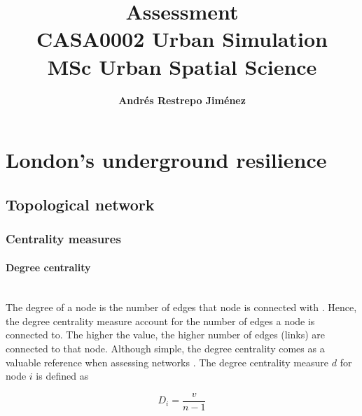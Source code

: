 \documentclass{article}
\title{\textbf{Assessment\\CASA0002 Urban Simulation\\MSc Urban Spatial Science}}
\author{\textbf{Andrés Restrepo Jiménez}}
\begin{document}
\maketitle


\section{London’s underground resilience}



\subsection{Topological network}

\subsubsection{Centrality measures}

\paragraph{Degree centrality}\mbox{}\\

The degree of a node is the number of edges that node is connected with \citep{arcauteNetworksUrbanSimulation2023}. Hence, the degree centrality measure account for the number of edges a node is connected to. The higher the value, the higher number of edges (links) are connected to that node. Although simple, the degree centrality comes as a valuable reference when assessing networks \citep{newmanNetworks2018}. The degree centrality measure $d$ for node $i$ is defined as 

\[D_{i} = \frac{v}{n-1}\]
\end{document}
